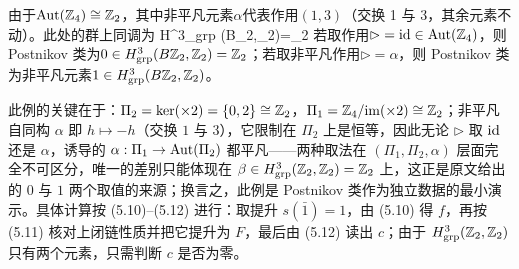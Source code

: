由于${\rm Aut}({\mathbb{Z}}_4) \cong {\mathbb{Z}}_2$，其中非平凡元素$\alpha$代表作用$(1,3)$（交换 1 与 3，其余元素不动）。此处的群上同调为
\be H^3_{\rm grp} (B\bbZ_2,\bbZ_2)=\bbZ_2 \ee
若取作用$\rhd = {\rm id}\in {\rm Aut}({\mathbb{Z}}_4)$，则 Postnikov 类为$0\in H^3_{\rm grp} (B{\mathbb{Z}}_2,{\mathbb{Z}}_2)={\mathbb{Z}}_2$；若取非平凡作用$\rhd = \alpha $，则 Postnikov 类为非平凡元素$1\in H^3_{\rm grp} (B{\mathbb{Z}}_2,{\mathbb{Z}}_2)$。

\begin{yizhu}此例的关键在于：$\Pi_2={\rm ker}(\times2)=\{0,2\}\cong{\mathbb{Z}}_2$，$\Pi_1={\mathbb{Z}}_4/{\rm im}(\times2)\cong{\mathbb{Z}}_2$；非平凡自同构 $\alpha$ 即 $h\mapsto -h$（交换 $1$ 与 $3$），它限制在 $\Pi_2$ 上是恒等，因此无论 $\rhd$ 取 ${\rm id}$ 还是 $\alpha$，诱导的 $\alpha:\Pi_1\to{\rm Aut}(\Pi_2)$ 都平凡——两种取法在 $(\Pi_1,\Pi_2,\alpha)$ 层面完全不可区分，唯一的差别只能体现在 $\beta\in H^3_{\rm grp}({\mathbb{Z}}_2,{\mathbb{Z}}_2)={\mathbb{Z}}_2$ 上，这正是原文给出的 $0$ 与 $1$ 两个取值的来源；换言之，此例是 Postnikov 类作为独立数据的最小演示。具体计算按 (5.10)--(5.12) 进行：取提升 $s(\bar{1})=1$，由 (5.10) 得 $f$，再按 (5.11) 核对上闭链性质并把它提升为 $F$，最后由 (5.12) 读出 $c$；由于 $H^3_{\rm grp}({\mathbb{Z}}_2,{\mathbb{Z}}_2)$ 只有两个元素，只需判断 $c$ 是否为零。\end{yizhu}

